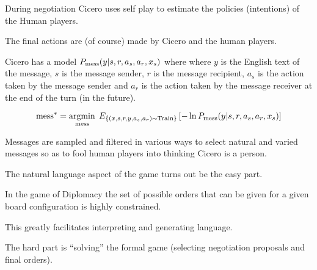 {

During negotiation
Cicero uses self play to estimate the policies (intentions) of the Human players.


\vfill
The final actions are (of course) made by Cicero and the human players.


Cicero has a model $P_{\mathrm{mess}}(y|s,r,a_s,a_r,x_s)$ where
where $y$ is the English text of the message, $s$ is the message sender, $r$ is the message recipient,
$a_s$ is the action taken by the message sender and $a_r$ is the action
taken by the message receiver at the end of the turn (in the future).


\vfill

{\huge
$$\mathrm{mess}^* = \operatorname*{argmin}_{\mathrm{mess}}\;E_{\{(x,s,r,y,a_s,a_r) \sim \mathrm{Train}\}} \left[-\ln P_{\mathrm{mess}}(y|s,r,a_s,a_r,x_s)\right]$$
}




Messages are sampled and filtered in various ways to select natural and varied messages so as to fool human players into thinking Cicero is a person.


The natural language aspect of the game turns out be the easy part.

\vfill
In the game of Diplomacy the set of possible orders that can be given for a given board configuration is highly constrained.

\vfill
This greatly facilitates interpreting and generating language.

\vfill
The hard part is ``solving'' the formal game (selecting negotiation proposals and final orders).


}

